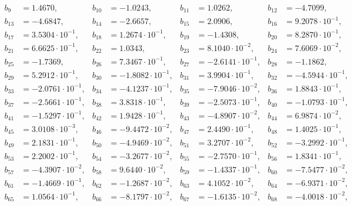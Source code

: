 \begin{align*}
b_{ 9 } &= 1.4670, & b_{ 10 } &= -1.0243, & b_{ 11 } &= 1.0262, & b_{ 12 } &= -4.7099,\\ 
b_{ 13 } &= -4.6847, & b_{ 14 } &= -2.6657, & b_{ 15 } &= 2.0906, & b_{ 16 } &= 9.2078 \cdot 10^{ -1 },\\ 
b_{ 17 } &= 3.5304 \cdot 10^{ -1 }, & b_{ 18 } &= 1.2674 \cdot 10^{ -1 }, & b_{ 19 } &= -1.4308, & b_{ 20 } &= 8.2870 \cdot 10^{ -1 },\\ 
b_{ 21 } &= 6.6625 \cdot 10^{ -1 }, & b_{ 22 } &= 1.0343, & b_{ 23 } &= 8.1040 \cdot 10^{ -2 }, & b_{ 24 } &= 7.6069 \cdot 10^{ -2 },\\ 
b_{ 25 } &= -1.7369, & b_{ 26 } &= 7.3467 \cdot 10^{ -1 }, & b_{ 27 } &= -2.6141 \cdot 10^{ -1 }, & b_{ 28 } &= -1.1862,\\ 
b_{ 29 } &= 5.2912 \cdot 10^{ -1 }, & b_{ 30 } &= -1.8082 \cdot 10^{ -1 }, & b_{ 31 } &= 3.9904 \cdot 10^{ -1 }, & b_{ 32 } &= -4.5944 \cdot 10^{ -1 },\\ 
b_{ 33 } &= -2.0761 \cdot 10^{ -1 }, & b_{ 34 } &= -4.1237 \cdot 10^{ -1 }, & b_{ 35 } &= -7.9046 \cdot 10^{ -2 }, & b_{ 36 } &= 1.8843 \cdot 10^{ -1 },\\ 
b_{ 37 } &= -2.5661 \cdot 10^{ -1 }, & b_{ 38 } &= 3.8318 \cdot 10^{ -1 }, & b_{ 39 } &= -2.5073 \cdot 10^{ -1 }, & b_{ 40 } &= -1.0793 \cdot 10^{ -1 },\\ 
b_{ 41 } &= -1.5297 \cdot 10^{ -1 }, & b_{ 42 } &= 1.9428 \cdot 10^{ -1 }, & b_{ 43 } &= -4.8907 \cdot 10^{ -2 }, & b_{ 44 } &= 6.9874 \cdot 10^{ -2 },\\ 
b_{ 45 } &= 3.0108 \cdot 10^{ -3 }, & b_{ 46 } &= -9.4472 \cdot 10^{ -2 }, & b_{ 47 } &= 2.4490 \cdot 10^{ -1 }, & b_{ 48 } &= 1.4025 \cdot 10^{ -1 },\\ 
b_{ 49 } &= 2.1831 \cdot 10^{ -1 }, & b_{ 50 } &= -4.9469 \cdot 10^{ -2 }, & b_{ 51 } &= 3.2707 \cdot 10^{ -2 }, & b_{ 52 } &= -3.2992 \cdot 10^{ -1 },\\ 
b_{ 53 } &= 2.2002 \cdot 10^{ -1 }, & b_{ 54 } &= -3.2677 \cdot 10^{ -2 }, & b_{ 55 } &= -2.7570 \cdot 10^{ -1 }, & b_{ 56 } &= 1.8341 \cdot 10^{ -1 },\\ 
b_{ 57 } &= -4.3907 \cdot 10^{ -2 }, & b_{ 58 } &= 9.6440 \cdot 10^{ -2 }, & b_{ 59 } &= -1.4337 \cdot 10^{ -1 }, & b_{ 60 } &= -7.5477 \cdot 10^{ -2 },\\ 
b_{ 61 } &= -1.4669 \cdot 10^{ -1 }, & b_{ 62 } &= -1.2687 \cdot 10^{ -2 }, & b_{ 63 } &= 4.1052 \cdot 10^{ -2 }, & b_{ 64 } &= -6.9371 \cdot 10^{ -2 },\\ 
b_{ 65 } &= 1.0564 \cdot 10^{ -1 }, & b_{ 66 } &= -8.1797 \cdot 10^{ -2 }, & b_{ 67 } &= -1.6135 \cdot 10^{ -2 }, & b_{ 68 } &= -4.0018 \cdot 10^{ -2 },\\ 

\end{align*}
